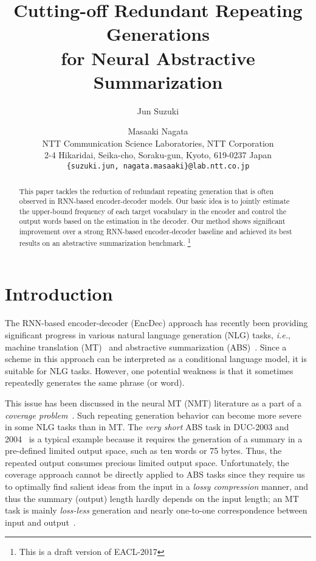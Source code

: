 \documentclass[11pt]{article}
\title{Cutting-off Redundant Repeating Generations \\
for Neural Abstractive Summarization
}
\author{Jun Suzuki \and Masaaki Nagata \\
 NTT Communication Science Laboratories, NTT Corporation\\
 2-4 Hikaridai, Seika-cho, Soraku-gun, Kyoto, 619-0237 Japan\\
 {\tt \{suzuki.jun, nagata.masaaki\}@lab.ntt.co.jp} 
}
\date{}
\begin{document}
\maketitle
\begin{abstract}
 This paper tackles the reduction of redundant repeating generation that is often observed in RNN-based encoder-decoder models.
 Our basic idea is to jointly estimate the upper-bound frequency of each target vocabulary in the encoder and control the output words based on the estimation in the decoder.
 Our method shows significant improvement over a strong RNN-based encoder-decoder baseline and achieved its best results on an abstractive summarization benchmark.
 \footnote{This is a draft version of EACL-2017}
\end{abstract}


\section{Introduction}\label{sec:introduction}
   The RNN-based encoder-decoder (EncDec) approach 
   has recently been providing significant progress in various natural language generation (NLG) tasks, {\it i.e.},
   machine translation (MT)~\cite{DBLP:conf/nips/SutskeverVL14,cho-EtAl:2014:EMNLP2014}
   and abstractive summarization (ABS)~\cite{rush-chopra-weston:2015:EMNLP}.
   Since a scheme in this approach can be interpreted as a conditional language model, it is suitable for NLG tasks.
   However, one potential weakness is that it sometimes repeatedly generates the same phrase (or word).



   This issue has been discussed in the neural MT (NMT) literature as a part of a {\it coverage problem}~\cite{tu-EtAl:2016:P16-1,mi-EtAl:2016:EMNLP2016}.
   Such repeating generation behavior can become more severe in some NLG tasks than in MT.
   The {\it very short} ABS task in DUC-2003 and 2004~\cite{Over:2007:DC:1284916.1285157} is a typical example
   because it requires the generation of a summary in a pre-defined limited output space, such as ten words or 75 bytes.
   Thus, the repeated output consumes precious limited output space.
   Unfortunately, the coverage approach cannot be directly applied to ABS tasks
   since they require us to optimally find salient ideas from the input in a {\it lossy compression} manner, and thus the summary (output) length hardly depends on the input length; an MT task is mainly {\it loss-less} generation and nearly one-to-one correspondence between input and output~\cite{DBLP:journals/corr/NallapatiXZ16}. 
 
\end{document}
